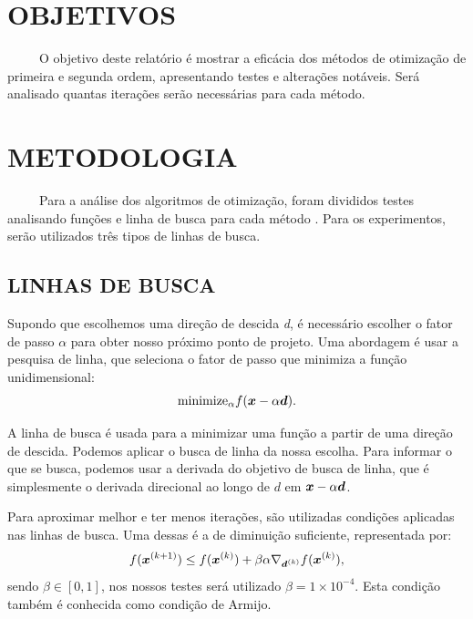\documentclass[12pt]{article}
\begin{document}
 
 \newpage
 \tableofcontents{}
 
 \newpage
 \setcounter{page}{1}

\section{OBJETIVOS}
 
 
\ \ \ \ \ O objetivo deste relatório é mostrar a eficácia dos métodos de otimização de primeira e segunda ordem, apresentando testes e alterações notáveis. Será analisado quantas iterações serão necessárias para cada método.
 
 
 
\section{METODOLOGIA}
\ \ \ \ \ Para a análise dos algoritmos de otimização, foram divididos testes analisando funções e linha de busca para cada método \cite{kochenderfer2019algorithms}. Para os experimentos, serão utilizados três tipos de linhas de busca.
\subsection{LINHAS DE BUSCA}
Supondo que escolhemos uma direção de descida \textit{d}, é necessário escolher
o fator de passo $\alpha$ para obter nosso próximo ponto de projeto. Uma abordagem é usar a pesquisa de linha,
que seleciona o fator de passo que minimiza a função unidimensional:
\begin{equation}
\text{minimize}_{\alpha} f(\boldsymbol{x} - \alpha \boldsymbol{d}).
\end{equation}

 A linha de busca é usada para a minimizar uma função a partir de uma direção de descida. Podemos aplicar o busca de linha da nossa escolha. Para informar o que se busca, podemos usar a derivada do objetivo de busca de linha, que é simplesmente o derivada direcional ao longo de $d$ em $\boldsymbol{x} - \alpha \boldsymbol{d}$.

Para aproximar melhor e ter menos iterações, são utilizadas condições aplicadas nas linhas de busca. Uma dessas é a de diminuição suficiente, representada por:
\begin{equation}
f(\boldsymbol{x}^{(k+1)}) \leq f(\boldsymbol{x}^{(k)}) + \beta\alpha \nabla_{\boldsymbol{d}^{(k)}}f(\boldsymbol{x}^{(k)}),
\end{equation}
sendo $\beta \in [0,1]$, nos nossos testes será utilizado $\beta  = 1 \times 10^{-4}$. Esta condição também é conhecida como condição de Armijo. 
\end{document}
